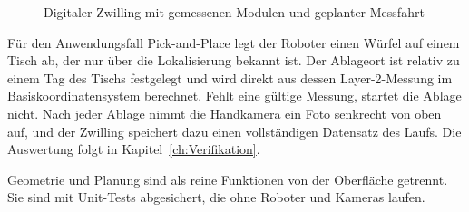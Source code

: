 \begin{figure}[htbp]
    \centering
    \caption{Digitaler Zwilling mit gemessenen Modulen und geplanter Messfahrt}
    \label{fig:dz-screenshot}
\end{figure}

Für den Anwendungsfall Pick-and-Place legt der Roboter einen Würfel auf einem Tisch ab, der nur über die Lokalisierung bekannt ist. Der Ablageort ist relativ zu einem Tag des Tischs festgelegt und wird direkt aus dessen Layer-2-Messung im Basiskoordinatensystem berechnet. Fehlt eine gültige Messung, startet die Ablage nicht. Nach jeder Ablage nimmt die Handkamera ein Foto senkrecht von oben auf, und der Zwilling speichert dazu einen vollständigen Datensatz des Laufs. Die Auswertung folgt in Kapitel~\ref{ch:Verifikation}.

Geometrie und Planung sind als reine Funktionen von der Oberfläche getrennt. Sie sind mit Unit-Tests abgesichert, die ohne Roboter und Kameras laufen. 
